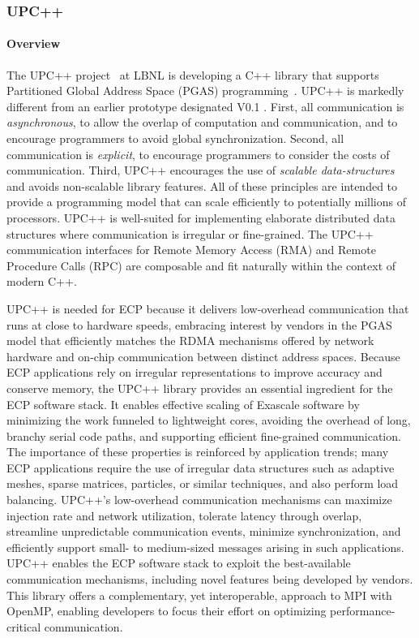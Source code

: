 \subsubsection{ UPC++} 
\paragraph{Overview} 
The UPC++ project~\cite{upcxx-site} at LBNL is developing a C++ library
that supports Partitioned Global Address Space (PGAS) programming~\cite{Bachan:paw17,upcxx-spec}.
UPC++ is markedly different from an earlier prototype designated V0.1 \cite{zheng:ipdps14}.  
First, all communication is \emph{asynchronous}, to allow the overlap of computation and
communication, and to encourage programmers to avoid global synchronization. Second, all communication
is \emph{explicit}, to encourage programmers to consider the costs of communication. Third,
UPC++ encourages the use of \emph{scalable data-structures}
and avoids non-scalable library features.
All of these principles are intended to provide a programming model that can
scale efficiently to potentially millions of processors.
UPC++ is well-suited for implementing elaborate distributed data structures where
communication is irregular or fine-grained. 
The UPC++ communication interfaces for Remote Memory Access (RMA) 
and Remote Procedure Calls (RPC)
are composable and fit naturally within the context of modern C++.

UPC++ is needed for ECP because it delivers low-overhead communication that runs
at close to hardware speeds, embracing 
interest by vendors in the PGAS model that
efficiently matches the RDMA mechanisms offered by
network hardware and on-chip communication between distinct address
spaces.  
Because ECP applications rely on irregular representations
to improve accuracy and conserve memory, the UPC++ library provides
an essential ingredient for the ECP software stack.  It enables
effective scaling of Exascale software by minimizing the work funneled
to lightweight cores, avoiding the overhead of long, branchy serial
code paths, and supporting efficient fine-grained communication.  The
importance of these properties is reinforced by application trends;
many ECP applications require the use of irregular data structures such as 
adaptive meshes, sparse
matrices, particles, or similar techniques, and also perform load balancing.  UPC++'s
low-overhead communication mechanisms can maximize injection rate and
network utilization, tolerate latency through overlap, streamline
unpredictable communication events, minimize synchronization, and
efficiently support small- to medium-sized messages arising in such
applications.  UPC++ enables the ECP software stack to exploit
the best-available communication mechanisms, including novel features
being developed by vendors.  This library offers a complementary,
yet interoperable, approach to MPI with OpenMP, enabling developers to
focus their effort on optimizing performance-critical communication.

